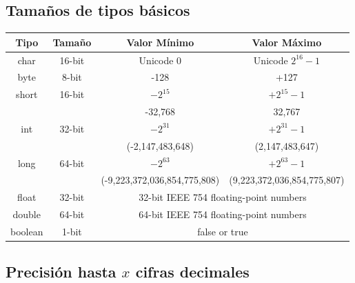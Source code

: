 \subsection{Tama\~{n}os de tipos b\'asicos}

\begin{center}
	\begin{tabular}{|c|c|c|c|}
		\hline
		\textbf{Tipo} & \textbf{Tama\~{n}o} & \textbf{Valor M\'inimo} & \textbf{Valor M\'aximo} \\
		\hline
		char & 16-bit & Unicode 0 & Unicode $2^{16}-1$ \\
		\hline
		byte & 8-bit & -128 & +127 \\
		\hline
		\multirow{2}{*}{short} & \multirow{2}{*}{16-bit} & $-2^{15}$ & $+2^{15}-1$ \\
		\cline{3-4}
		& & -32,768	& 32,767\\
		\hline
		\multirow{2}{*}{int} & \multirow{2}{*}{32-bit} & $-2^{31}$ & $+2^{31}-1$ \\
		\cline{3-4}
		& & (-2,147,483,648) & (2,147,483,647)\\
		\hline
		\multirow{2}{*}{long} & \multirow{2}{*}{64-bit} & $-2^{63}$ & $+2^{63}-1$ \\
		\cline{3-4}
		& & (-9,223,372,036,854,775,808) & (9,223,372,036,854,775,807)\\
		\hline
		float & 32-bit & \multicolumn{2}{|c|}{32-bit IEEE 754 floating-point numbers}\\
		\hline
		double & 64-bit & \multicolumn{2}{|c|}{64-bit IEEE 754 floating-point numbers}\\
		\hline
		boolean & 1-bit & \multicolumn{2}{|c|}{false or true}\\
		\hline
	\end{tabular}
\end{center}

\subsection{Precisi\'on hasta $x$ cifras decimales}
\begin{center}
\end{center}

